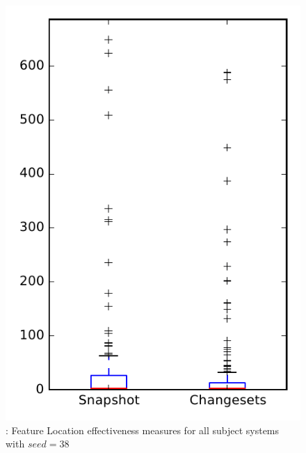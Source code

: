 
\begin{figure}
\centering
\includegraphics[height=0.4\textheight]{figures/flt_seed/rq1_overview_38}
\caption{\rone: Feature Location effectiveness measures for all subject systems with $seed=38$}
\label{fig:flt_seed:rq1:overview}
\end{figure}
